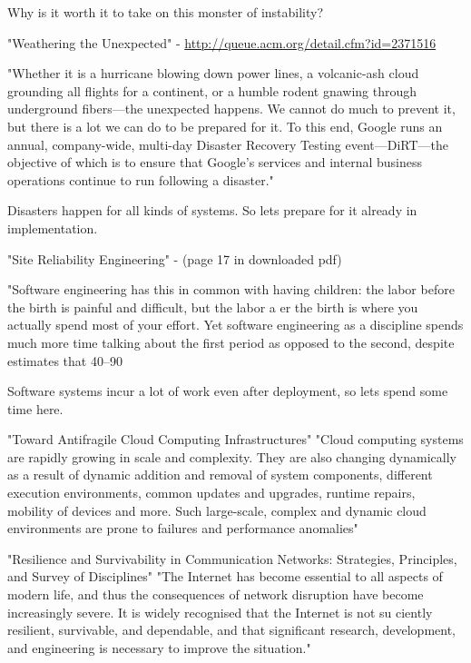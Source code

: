 {Why is it worth it to take on this monster of instability?


"Weathering the Unexpected" - \url{http://queue.acm.org/detail.cfm?id=2371516}

"Whether it is a hurricane blowing down power lines, a volcanic-ash cloud grounding all flights for a continent, or a humble rodent gnawing through underground fibers—the unexpected happens. We cannot do much to prevent it, but there is a lot we can do to be prepared for it. To this end, Google runs an annual, company-wide, multi-day Disaster Recovery Testing event—DiRT—the objective of which is to ensure that Google's services and internal business operations continue to run following a disaster."


Disasters happen for all kinds of systems. So lets prepare for it already in implementation.


"Site Reliability Engineering" - (page 17 in downloaded pdf)

"Software engineering has this in common with having children: the labor before the birth is painful and difficult, but the labor a er the birth is where you actually spend most of your effort. Yet software engineering as a discipline spends much more time talking about the first period as opposed to the second, despite estimates that 40–90%


Software systems incur a lot of work even after deployment, so lets spend some time here.



"Toward Antifragile Cloud Computing Infrastructures"\cite{abid2014toward}
"Cloud computing systems are rapidly growing in scale and complexity. They are also changing dynamically as a result of dynamic addition and removal of system components, different execution environments, common updates and upgrades, runtime repairs, mobility of devices and more. Such large-scale, complex and dynamic cloud environments are prone to failures and performance anomalies"


"Resilience and Survivability in Communication Networks: Strategies, Principles, and Survey of Disciplines"\cite{sterbenz2010resilience}
"The Internet has become essential to all aspects of modern life, and thus the consequences of network disruption have become increasingly severe. It is widely recognised that the Internet is not su ciently resilient, survivable, and dependable, and that significant research, development, and engineering is necessary to improve the situation."

}
